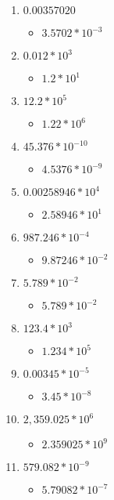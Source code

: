 \begin{enumerate}
\begin{itemize}
  \end{itemize}
\item $0.00357020$
  \begin{itemize}
  \item $3.5702 *10^{-3}$
  \end{itemize}
\item $0.012*10^{3}$
  \begin{itemize}
  \item $1.2 *10^{1}$
  \end{itemize}
\item $12.2*10^{5}$
  \begin{itemize}
  \item $1.22 *10^{6}$
  \end{itemize}
\item $45.376*10^{-10}$
  \begin{itemize}
  \item $4.5376 *10^{-9}$
  \end{itemize}
\item $0.00258946*10^{4}$
  \begin{itemize}
  \item $2.58946 *10^{1}$
  \end{itemize}
\item $987.246*10^{-4}$
  \begin{itemize}
  \item $9.87246 *10^{-2}$
  \end{itemize}
\item $5.789*10^{-2}$
  \begin{itemize}
  \item $5.789*10^{-2}$
  \end{itemize}
\item $123.4*10^{3}$
  \begin{itemize}
  \item $1.234 *10^{5}$
  \end{itemize}
\item $0.00345*10^{-5}$
  \begin{itemize}
  \item $3.45 *10^{-8}$
  \end{itemize}
\item $2,359.025*10^{6}$
  \begin{itemize}
  \item $2.359025 *10^{9}$
  \end{itemize}
\item $579.082*10^{-9}$
  \begin{itemize}
  \item $5.79082 *10^{-7}$
  \end{itemize}
\end{enumerate}
